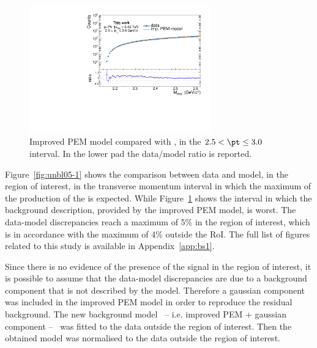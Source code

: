 \begin{figure} [htb]
    \centering
    \includegraphics[width=0.70\textwidth]{gfx/appendix/backsub/can_unblind5}
    \caption{Improved PEM model compared with \minv, in the $2.5 < \pt \leq 3.0$ \gevc interval. In the lower pad the data/model ratio is reported.}
	\label{fig:unbl2.5-3}
\end{figure}

Figure~\ref{fig:unbl05-1} shows the comparison between data and model, in the region of interest,
in the transverse momentum interval in which the maximum of the production of the \ds is expected.
While Figure~\ref{fig:unbl2.5-3} shows the \pt interval in which the background description,
provided by the improved PEM model, is worst.
The data-model discrepancies reach a maximum of 5\% in the region of interest, which is in accordance 
with the maximum of 4\% outside the RoI.
The full list of figures related to this study is available in Appendix~\ref{app:bs1}.

Since there is no evidence of the presence of the \ds signal in the region of interest, it is possible
to assume that the data-model discrepancies are due to a background component that is not described by 
the model.
Therefore a gaussian component was included in the improved PEM model in order to
reproduce the residual background.
The new background model \ -- i.e. improved PEM + gaussian component -- \ was fitted to the data
outside the region of interest.
Then the obtained model was normalised to the data outside the region of interest.

